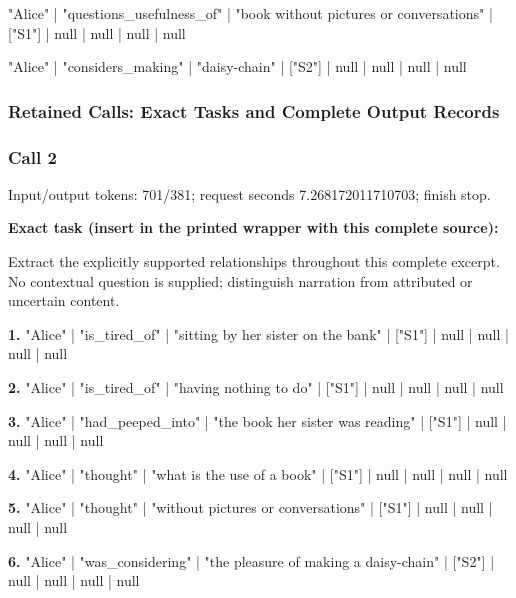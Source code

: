 "Alice" | "questions\_usefulness\_of" | "book without pictures or conversations" | ["S1"] | null | null | null | null\par\smallskip

"Alice" | "considers\_making" | "daisy-chain" | ["S2"] | null | null | null | null\par\smallskip

\subsubsection*{Retained Calls: Exact Tasks and Complete Output Records}

\subsubsection*{Call 2}

Input/output tokens: 701/381; request seconds 7.268172011710703; finish stop.

\noindent\textbf{Exact task (insert in the printed wrapper with this complete source):}\par Extract the explicitly supported relationships throughout this complete excerpt. No contextual question is supplied; distinguish narration from attributed or uncertain content.

\noindent\textbf{1.} "Alice" | "is\_tired\_of" | "sitting by her sister on the bank" | ["S1"] | null | null | null | null\par\smallskip

\noindent\textbf{2.} "Alice" | "is\_tired\_of" | "having nothing to do" | ["S1"] | null | null | null | null\par\smallskip

\noindent\textbf{3.} "Alice" | "had\_peeped\_into" | "the book her sister was reading" | ["S1"] | null | null | null | null\par\smallskip

\noindent\textbf{4.} "Alice" | "thought" | "what is the use of a book" | ["S1"] | null | null | null | null\par\smallskip

\noindent\textbf{5.} "Alice" | "thought" | "without pictures or conversations" | ["S1"] | null | null | null | null\par\smallskip

\noindent\textbf{6.} "Alice" | "was\_considering" | "the pleasure of making a daisy-chain" | ["S2"] | null | null | null | null\par\smallskip

